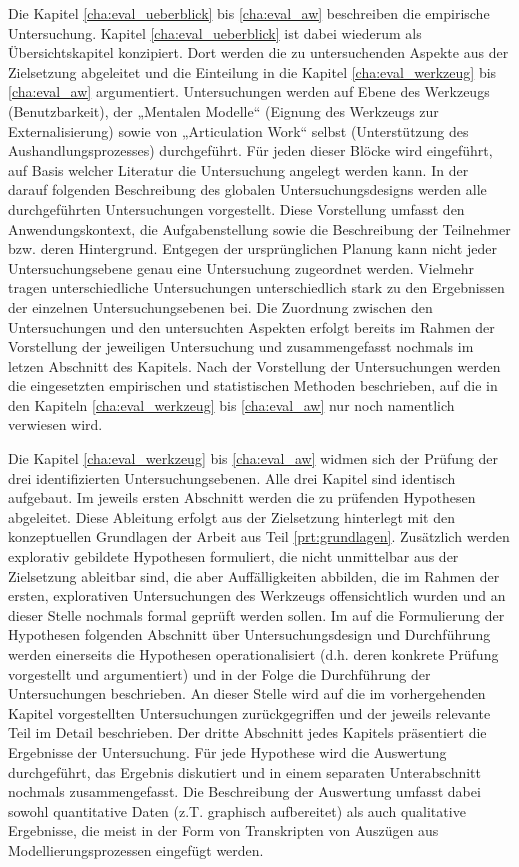 Die Kapitel \ref{cha:eval_ueberblick} bis \ref{cha:eval_aw} beschreiben die empirische Untersuchung. Kapitel \ref{cha:eval_ueberblick} ist dabei wiederum als Übersichtskapitel konzipiert. Dort werden die zu untersuchenden Aspekte aus der Zielsetzung abgeleitet und die Einteilung in die Kapitel \ref{cha:eval_werkzeug} bis \ref{cha:eval_aw} argumentiert. Untersuchungen werden auf Ebene des Werkzeugs (Benutzbarkeit), der „Mentalen Modelle“ (Eignung des Werkzeugs zur Externalisierung) sowie von „Articulation Work“ selbst (Unterstützung des Aushandlungsprozesses) durchgeführt. Für jeden dieser Blöcke wird eingeführt, auf Basis welcher Literatur die Untersuchung angelegt werden kann. In der darauf folgenden Beschreibung des globalen Untersuchungsdesigns werden alle durchgeführten Untersuchungen vorgestellt. Diese Vorstellung umfasst den Anwendungskontext, die Aufgabenstellung sowie die Beschreibung der Teilnehmer bzw. deren Hintergrund. Entgegen der ursprünglichen Planung kann nicht jeder Untersuchungsebene genau eine Untersuchung zugeordnet werden. Vielmehr tragen unterschiedliche Untersuchungen unterschiedlich stark zu den Ergebnissen der einzelnen Untersuchungsebenen bei. Die Zuordnung zwischen den Untersuchungen und den untersuchten Aspekten erfolgt bereits im Rahmen der Vorstellung der jeweiligen Untersuchung und zusammengefasst nochmals im letzen Abschnitt des Kapitels. Nach der Vorstellung der Untersuchungen werden die eingesetzten empirischen und statistischen Methoden beschrieben, auf die in den Kapiteln \ref{cha:eval_werkzeug} bis \ref{cha:eval_aw} nur noch namentlich verwiesen wird.

Die Kapitel \ref{cha:eval_werkzeug} bis \ref{cha:eval_aw} widmen sich der Prüfung der drei identifizierten Untersuchungsebenen. Alle drei Kapitel sind identisch aufgebaut. Im jeweils ersten Abschnitt werden die zu prüfenden Hypothesen abgeleitet. Diese Ableitung erfolgt aus der Zielsetzung hinterlegt mit den konzeptuellen Grundlagen der Arbeit aus Teil \ref{prt:grundlagen}. Zusätzlich werden explorativ gebildete Hypothesen formuliert, die nicht unmittelbar aus der Zielsetzung ableitbar sind, die aber Auffälligkeiten abbilden, die im Rahmen der ersten, explorativen Untersuchungen des Werkzeugs offensichtlich wurden und an dieser Stelle nochmals formal geprüft werden sollen. Im auf die Formulierung der Hypothesen folgenden Abschnitt über Untersuchungsdesign und Durchführung werden einerseits die Hypothesen operationalisiert (d.h. deren konkrete Prüfung vorgestellt und argumentiert) und in der Folge die Durchführung der Untersuchungen beschrieben. An dieser Stelle wird auf die im vorhergehenden Kapitel vorgestellten Untersuchungen zurückgegriffen und der jeweils relevante Teil im Detail beschrieben. Der dritte Abschnitt jedes Kapitels präsentiert die Ergebnisse der Untersuchung. Für jede Hypothese wird die Auswertung durchgeführt, das Ergebnis diskutiert und in einem separaten Unterabschnitt nochmals zusammengefasst. Die Beschreibung der Auswertung umfasst dabei sowohl quantitative Daten (z.T. graphisch aufbereitet) als auch qualitative Ergebnisse, die meist in der Form von Transkripten von Auszügen aus Modellierungsprozessen eingefügt werden.

